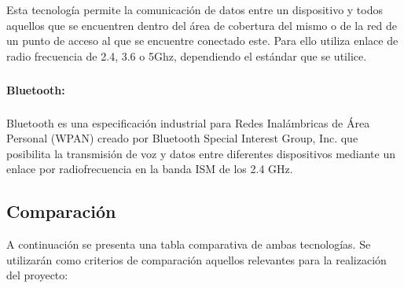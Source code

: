                 \par Esta tecnología permite la comunicación de datos entre un dispositivo y todos aquellos que se encuentren dentro del área de cobertura del mismo o de la red de un punto de acceso al que se encuentre conectado este. Para ello utiliza enlace de radio frecuencia de 2.4, 3.6 o 5Ghz, dependiendo el estándar que se utilice.
                
                \paragraph{Bluetooth\textsuperscript{\textregistered}:} Bluetooth\textsuperscript{\textregistered} es una especificación industrial para Redes Inalámbricas de Área Personal (WPAN) creado por Bluetooth Special Interest Group, Inc. que posibilita la transmisión de voz y datos entre diferentes dispositivos mediante un enlace por radiofrecuencia en la banda ISM de los 2.4 GHz.
                
        \subsection{Comparación}
            \par A continuación se presenta una tabla comparativa de ambas tecnologías. Se utilizarán como criterios de comparación aquellos relevantes para la realización del proyecto:
            
